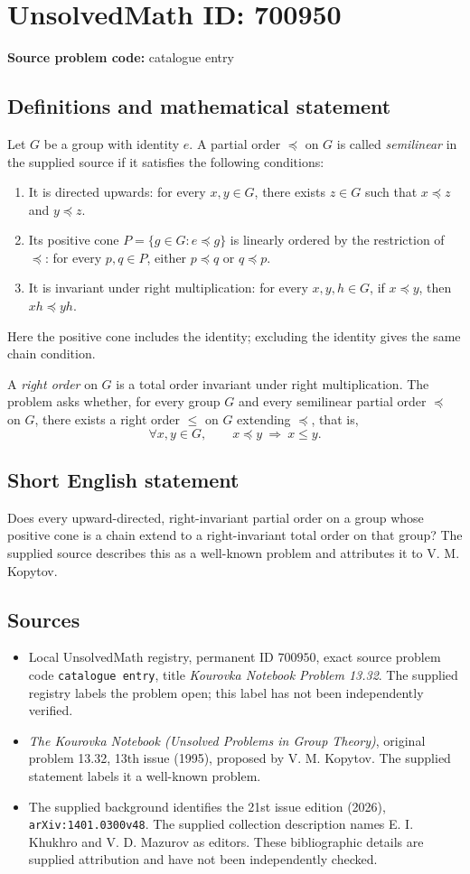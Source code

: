 \documentclass[11pt]{article}
\begin{document}
\section*{UnsolvedMath ID: 700950}
\textbf{Source problem code:} catalogue entry
\subsection{Definitions and mathematical statement}
Let \(G\) be a group with identity \(e\). A partial order \(\preccurlyeq\) on \(G\) is called \emph{semilinear} in the supplied source if it satisfies the following conditions:
\begin{enumerate}
\item It is directed upwards: for every \(x,y\in G\), there exists \(z\in G\) such that \(x\preccurlyeq z\) and \(y\preccurlyeq z\).
\item Its positive cone \(P=\{g\in G:e\preccurlyeq g\}\) is linearly ordered by the restriction of \(\preccurlyeq\): for every \(p,q\in P\), either \(p\preccurlyeq q\) or \(q\preccurlyeq p\).
\item It is invariant under right multiplication: for every \(x,y,h\in G\), if \(x\preccurlyeq y\), then \(xh\preccurlyeq yh\).
\end{enumerate}
Here the positive cone includes the identity; excluding the identity gives the same chain condition.

A \emph{right order} on \(G\) is a total order invariant under right multiplication. The problem asks whether, for every group \(G\) and every semilinear partial order \(\preccurlyeq\) on \(G\), there exists a right order \(\leq\) on \(G\) extending \(\preccurlyeq\), that is,
\[
\forall x,y\in G,\qquad x\preccurlyeq y\ \Longrightarrow\ x\leq y.
\]
\subsection{Short English statement}
Does every upward-directed, right-invariant partial order on a group whose positive cone is a chain extend to a right-invariant total order on that group? The supplied source describes this as a well-known problem and attributes it to V. M. Kopytov.
\subsection{Sources}
\begin{itemize}
\item Local UnsolvedMath registry, permanent ID \(700950\), exact source problem code \texttt{catalogue entry}, title \emph{Kourovka Notebook Problem 13.32}. The supplied registry labels the problem open; this label has not been independently verified.
\item \emph{The Kourovka Notebook (Unsolved Problems in Group Theory)}, original problem 13.32, 13th issue (1995), proposed by V. M. Kopytov. The supplied statement labels it a well-known problem.
\item The supplied background identifies the 21st issue edition (2026), \texttt{arXiv:1401.0300v48}. The supplied collection description names E. I. Khukhro and V. D. Mazurov as editors. These bibliographic details are supplied attribution and have not been independently checked.
\end{itemize}
\end{document}
